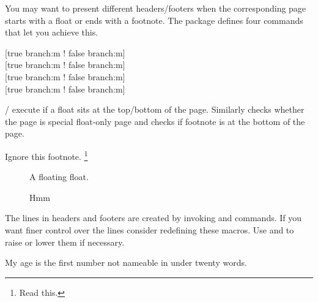 You may want to present different headers\slash{}footers when the corresponding
page starts with a float or ends with a footnote. The  package
defines four commands that let you achieve this.
\begin{lscommand}
  [true branch:m ! false branch:m] \\
  [true branch:m ! false branch:m] \\
  [true branch:m ! false branch:m] \\
  [true branch:m ! false branch:m]
\end{lscommand}
/ execute  if a float sits at
the top\slash{}bottom of the page. Similarly  checks whether
the page is special float-only page and  checks if footnote is
at the bottom of the page.
\begin{example}[standalone, paperheight=4cm, to_page=2, vertical_pages]
\geometry{includehead, includefoot, headsep=.5em, footskip=1em} %
\sloppy %
\usepackage{fancyhdr}%
\usepackage{extramarks}%
\pagestyle{fancy}%


\noindent %
Ignore this footnote.%
\footnote{Read this.}
\begin{figure}[t]
  \centering
  A floating float.
  \caption{Hmm}
\end{figure}
\end{example}

The lines in headers and footers are created by invoking  and
 commands. If you want finer control over the lines consider
redefining these macros. Use  and  to raise
or lower them if necessary.
\begin{example}[standalone, paperheight=4cm]
\geometry{includehead, includefoot, headsep=.5em, footskip=1em} %
\sloppy %
\usepackage{fancyhdr}%
\usepackage{extramarks}%
\pagestyle{fancy}%
\RenewDocumentCommand{\headrule}{}{
  \rule{0.05\headwidth}{0.2cm}%
  \rule[0.1cm]{0.9\headwidth}{\headrulewidth}%
  \rule{0.05\headwidth}{0.2cm}%
}

\RenewDocumentCommand{\headruleskip}{}{-0.2cm}

\noindent %
My age is the first number not
nameable in under twenty words.
\end{example}

